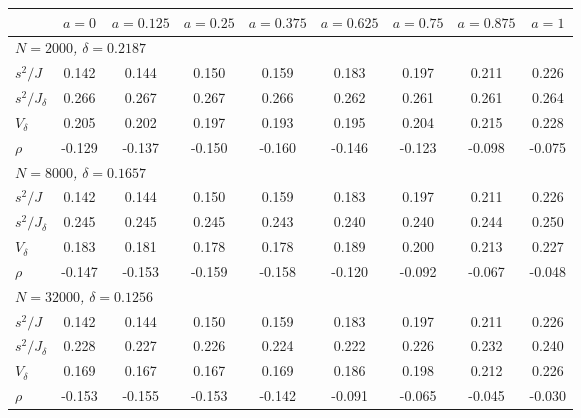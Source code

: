 \begin{tabular}{lcccccccc}
\toprule
 & $a=0$ & $a=0.125$ & $a=0.25$ & $a=0.375$ & $a=0.625$ & $a=0.75$ & $a=0.875$ & $a=1$ \\
\midrule
\multicolumn{9}{l}{\emph{$N=2000$, $\delta=0.2187$}} \\
$s^2/J$ & 0.142 & 0.144 & 0.150 & 0.159 & 0.183 & 0.197 & 0.211 & 0.226 \\
$s^2/J_\delta$ & 0.266 & 0.267 & 0.267 & 0.266 & 0.262 & 0.261 & 0.261 & 0.264 \\
$V_\delta$ & 0.205 & 0.202 & 0.197 & 0.193 & 0.195 & 0.204 & 0.215 & 0.228 \\
$\rho$ & -0.129 & -0.137 & -0.150 & -0.160 & -0.146 & -0.123 & -0.098 & -0.075 \\
\multicolumn{9}{l}{\emph{$N=8000$, $\delta=0.1657$}} \\
$s^2/J$ & 0.142 & 0.144 & 0.150 & 0.159 & 0.183 & 0.197 & 0.211 & 0.226 \\
$s^2/J_\delta$ & 0.245 & 0.245 & 0.245 & 0.243 & 0.240 & 0.240 & 0.244 & 0.250 \\
$V_\delta$ & 0.183 & 0.181 & 0.178 & 0.178 & 0.189 & 0.200 & 0.213 & 0.227 \\
$\rho$ & -0.147 & -0.153 & -0.159 & -0.158 & -0.120 & -0.092 & -0.067 & -0.048 \\
\multicolumn{9}{l}{\emph{$N=32000$, $\delta=0.1256$}} \\
$s^2/J$ & 0.142 & 0.144 & 0.150 & 0.159 & 0.183 & 0.197 & 0.211 & 0.226 \\
$s^2/J_\delta$ & 0.228 & 0.227 & 0.226 & 0.224 & 0.222 & 0.226 & 0.232 & 0.240 \\
$V_\delta$ & 0.169 & 0.167 & 0.167 & 0.169 & 0.186 & 0.198 & 0.212 & 0.226 \\
$\rho$ & -0.153 & -0.155 & -0.153 & -0.142 & -0.091 & -0.065 & -0.045 & -0.030 \\
\bottomrule
\end{tabular}
